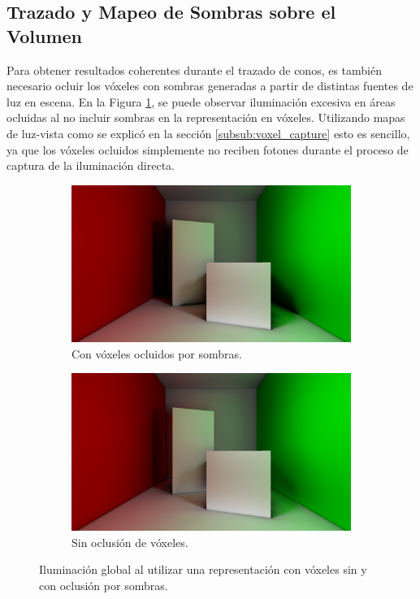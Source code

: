 \subsection{Trazado y Mapeo de Sombras sobre el Volumen} %
\label{sub:trazado_de_sombras_sobre_el_volumen}

Para obtener resultados coherentes durante el trazado de conos, es también necesario ocluir los vóxeles con sombras generadas a partir de distintas fuentes de luz en escena. En la Figura \ref{fig:voxel_shadow_error}, se puede observar iluminación excesiva en áreas ocluidas al no incluir sombras en la representación en vóxeles. Utilizando mapas de luz-vista como se explicó en la sección \ref{subsub:voxel_capture} esto es sencillo, ya que los vóxeles ocluidos simplemente no reciben fotones durante el proceso de captura de la iluminación directa.

\begin{figure}[H]
	\centering
	\begin{subfigure}[t]{0.49\textwidth}
		\centering
		\captionsetup{justification=centering}
		\includegraphics[width=\linewidth]{media/voxel_shadowing.png}
		\caption*{Con vóxeles ocluidos por sombras.}
	\end{subfigure}%
	\hspace{0.01\textwidth}
	\begin{subfigure}[t]{0.49\textwidth}
		\centering
		\captionsetup{justification=centering}
		\includegraphics[width=\linewidth]{media/voxel_noshadowing.png}
		\caption*{Sin oclusión de vóxeles.}
	\end{subfigure}%
	\caption{Iluminación global al utilizar una representación con vóxeles sin y con oclusión por sombras.}
	\label{fig:voxel_shadow_error}
\end{figure}


